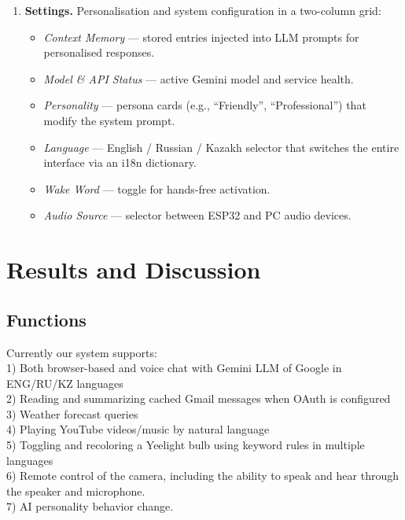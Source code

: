 \begin{enumerate}
    \item \textbf{Settings.} Personalisation and system configuration in a two-column grid:
    \begin{itemize}
        \item \textit{Context Memory} --- stored entries injected into LLM prompts for personalised responses.
        \item \textit{Model \& API Status} --- active Gemini model and service health.
        \item \textit{Personality} --- persona cards (e.g., ``Friendly'', ``Professional'') that modify the system prompt.
        \item \textit{Language} --- English / Russian / Kazakh selector that switches the entire interface via an i18n dictionary.
        \item \textit{Wake Word} --- toggle for hands-free activation.
        \item \textit{Audio Source} --- selector between ESP32 and PC audio devices.
    \end{itemize}
\end{enumerate}








\chapter{Results and Discussion}

\section{Functions}

Currently our system supports: \\
1) Both browser-based and voice chat with Gemini LLM of Google in ENG/RU/KZ languages\\ 
2) Reading and summarizing cached Gmail messages when OAuth is configured\\
3) Weather forecast queries \\
4) Playing YouTube videos/music by natural language \\
5) Toggling and recoloring a Yeelight bulb using keyword rules in multiple languages\\
6) Remote control of the camera, including the ability to speak and hear through the speaker and microphone.\\
7) AI personality behavior change.


